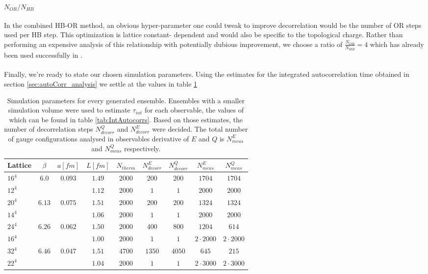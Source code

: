 \documentclass[a4paper,10pt]{book}
\begin{document}
\paragraph{$N_{OR}/N_{HB}$}
In the combined HB-OR method, an obvious hyper-parameter one could tweak to improve decorrelation would be the number of OR steps used per HB step. This optimization is lattice constant- dependent and would also be specific to the topological charge. Rather than performing an expensive analysis of this relationship with potentially dubious improvement, we choose a ratio of $\frac{N_{OR}}{N_{HB}}=4 $ which has already been used successfully in \cite{PhysRevD.92.094518}.\\\\Finally, we're ready to state our chosen simulation parameters. Using the estimates for the integrated autocorrelation time obtained in section \ref{sec:autoCorr_analysis} we settle at the values in table \ref{tab:SimulationParameters}
\begin{table}
\centering
\caption[Simulation parameters]{Simulation parameters for every generated ensemble. Ensembles with a smaller simulation volume were used to estimate $\tau_{int}$ for each observable, the values of which can be found in table \ref{tab:IntAutocorrs}. Based on those estimates, the number of decorrelation steps $N_{decorr}^Q$ and $N_{decorr}^E$ were decided. The total number of gauge configurations analysed in observables derivative of $E$ and $Q$ is $N_{meas}^E$ and $N_{meas}^Q$ respectively.}
\label{tab:SimulationParameters}
\begin{tabular}{lcccccccc}
\hline \hline Lattice & $\beta$ & $a[fm]$ & $L[fm]$ &$N_{therm}$ & $N_{decorr}^E$ & $N_{decorr}^Q$& $N_{meas}^E$& $N_{meas}^Q$\\
\hline		   $16^4$ &   $6.0$ & $0.093$ & $1.49$  		 		 &$2000$  	  & $200$		   & $200$		   & $1704$		 & $1704$ \\	  
	  		   $12^4$ & 		&     	  & $1.12$  		 		 &$2000$ 	  & $1$		   	   & $1$  		   & $2000$		 & $2000$\\ \hline 
	  		   $20^4$ &   $6.13$& $0.075$ & $1.51$  		 		 &$2000$ 	  & $200$		   & $200$		   & $1324$		 & $1324$ \\
	  		   $14^4$ & 		&  	 	  & $1.06$  		 		 &$2000$ 	  & $1$		       & $1$  		   & $2000$		 & $2000$\\ \hline
	  		   $24^4$ &   $6.26$& $0.062$ & $1.50$  		 		 &$2000$ 	  & $400$		   & $800$		   & $1204$		 & $614$ \\
	  		   $16^4$ & 		&  	 	  & $1.00$  		 		 &$2000$ 	  & $1$		       & $1$  		   & $2\cdot2000$		 & $2\cdot2000$\\ \hline
	  		   $32^4$ &   $6.46$& $0.047$ & $1.51$  		 		 &$4700$ 	  & $1350$		   & $4050$		   & $645$		 & $215$ \\
	  		   $22^4$ & 		&  	 	  & $1.04$  		 		 &$2000$ 	  & $1$		       & $1$  		   & $2\cdot3000$		 & $2\cdot3000$
\end{tabular}
\end{table}
\end{document}
